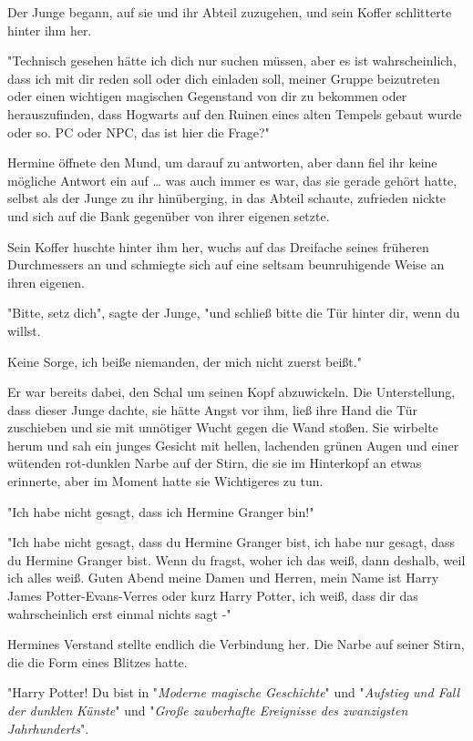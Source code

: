{Der Junge begann, auf sie und ihr Abteil zuzugehen, und sein Koffer schlitterte hinter ihm her.

"Technisch gesehen hätte ich dich nur suchen müssen, aber es ist wahrscheinlich, dass ich mit dir reden soll oder dich einladen soll, meiner Gruppe beizutreten oder einen wichtigen magischen Gegenstand von dir zu bekommen oder herauszufinden, dass Hogwarts auf den Ruinen eines alten Tempels gebaut wurde oder so. PC oder NPC, das ist hier die Frage?"

Hermine öffnete den Mund, um darauf zu antworten, aber dann fiel ihr keine mögliche Antwort ein auf … was auch immer es war, das sie gerade gehört hatte, selbst als der Junge zu ihr hinüberging, in das Abteil schaute, zufrieden nickte und sich auf die Bank gegenüber von ihrer eigenen setzte.

Sein Koffer huschte hinter ihm her, wuchs auf das Dreifache seines früheren Durchmessers an und schmiegte sich auf eine seltsam beunruhigende Weise an ihren eigenen.

"Bitte, setz dich", sagte der Junge, "und schließ bitte die Tür hinter dir, wenn du willst.

Keine Sorge, ich beiße niemanden, der mich nicht zuerst beißt."

Er war bereits dabei, den Schal um seinen Kopf abzuwickeln. Die Unterstellung, dass dieser Junge dachte, sie hätte Angst vor ihm, ließ ihre Hand die Tür zuschieben und sie mit unnötiger Wucht gegen die Wand stoßen. Sie wirbelte herum und sah ein junges Gesicht mit hellen, lachenden grünen Augen und einer wütenden rot-dunklen Narbe auf der Stirn, die sie im Hinterkopf an etwas erinnerte, aber im Moment hatte sie Wichtigeres zu tun.

"Ich habe nicht gesagt, dass ich Hermine Granger bin!"

"Ich habe nicht gesagt, dass du Hermine Granger bist, ich habe nur gesagt, dass du Hermine Granger bist. Wenn du fragst, woher ich das weiß, dann deshalb, weil ich alles weiß. Guten Abend meine Damen und Herren, mein Name ist Harry James Potter-Evans-Verres oder kurz Harry Potter, ich weiß, dass dir das wahrscheinlich erst einmal nichts sagt -"

Hermines Verstand stellte endlich die Verbindung her. Die Narbe auf seiner Stirn, die die Form eines Blitzes hatte.

"Harry Potter! Du bist in "\emph{Moderne magische Geschichte}" und "\emph{Aufstieg und Fall der dunklen} \emph{Künste}" und "\emph{Große zauberhafte Ereignisse des zwanzigsten Jahrhunderts}".

}
